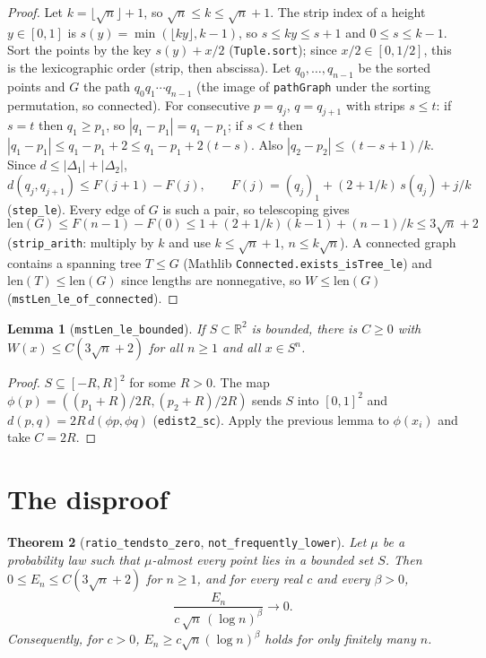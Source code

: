 \documentclass[11pt]{article}
\newtheorem{theorem}{Theorem}
\newtheorem{lemma}[theorem]{Lemma}
\theoremstyle{definition}
\begin{document}
\begin{proof}
Let $k=\lfloor\sqrt n\rfloor+1$, so $\sqrt n\le k\le\sqrt n+1$. The strip index of a height
$y\in[0,1]$ is $s(y)=\min(\lfloor ky\rfloor,k-1)$, so $s\le ky\le s+1$ and $0\le s\le k-1$.
Sort the points by the key $s(y)+x/2$ (\texttt{Tuple.sort}); since $x/2\in[0,1/2]$, this is the
lexicographic order (strip, then abscissa). Let $q_0,\dots,q_{n-1}$ be the sorted points and $G$
the path $q_0q_1\cdots q_{n-1}$ (the image of \texttt{pathGraph} under the sorting permutation, so
connected). For consecutive $p=q_j$, $q=q_{j+1}$ with strips $s\le t$:
if $s=t$ then $q_1\ge p_1$, so $|q_1-p_1|=q_1-p_1$; if $s<t$ then $|q_1-p_1|\le q_1-p_1+2\le
q_1-p_1+2(t-s)$. Also $|q_2-p_2|\le(t-s+1)/k$. Since $d\le|\Delta_1|+|\Delta_2|$,
\[ d(q_j,q_{j+1})\le F(j+1)-F(j),\qquad F(j)=(q_j)_1+(2+1/k)\,s(q_j)+j/k \]
(\texttt{step\_le}). Every edge of $G$ is such a pair, so telescoping gives
\[ \mathrm{len}(G)\le F(n-1)-F(0)\le 1+(2+1/k)(k-1)+(n-1)/k \le 3\sqrt n+2 \]
(\texttt{strip\_arith}: multiply by $k$ and use $k\le\sqrt n+1$, $n\le k\sqrt n$). A connected
graph contains a spanning tree $T\le G$ (Mathlib \texttt{Connected.exists\_isTree\_le}) and
$\mathrm{len}(T)\le\mathrm{len}(G)$ since lengths are nonnegative, so $W\le\mathrm{len}(G)$
(\texttt{mstLen\_le\_of\_connected}).
\end{proof}

\begin{lemma}[\texttt{mstLen\_le\_bounded}]
If $S\subset\mathbb{R}^2$ is bounded, there is $C\ge0$ with $W(x)\le C(3\sqrt n+2)$ for all
$n\ge1$ and all $x\in S^n$.
\end{lemma}

\begin{proof}
$S\subseteq[-R,R]^2$ for some $R>0$. The map $\phi(p)=((p_1+R)/2R,(p_2+R)/2R)$ sends $S$ into
$[0,1]^2$ and $d(p,q)=2R\,d(\phi p,\phi q)$ (\texttt{edist2\_sc}). Apply the previous lemma to
$\phi(x_i)$ and take $C=2R$.
\end{proof}

\section{The disproof}

\begin{theorem}[\texttt{ratio\_tendsto\_zero}, \texttt{not\_frequently\_lower}]
Let $\mu$ be a probability law such that $\mu$-almost every point lies in a bounded set $S$. Then $0\le E_n\le C(3\sqrt n+2)$ for $n\ge1$, and for every real $c$ and
every $\beta>0$,
\[ \frac{E_n}{c\,\sqrt n\,(\log n)^\beta}\longrightarrow 0 .\]
Consequently, for $c>0$, $E_n\ge c\sqrt n(\log n)^\beta$ holds for only finitely many $n$.
\end{theorem}
\end{document}
